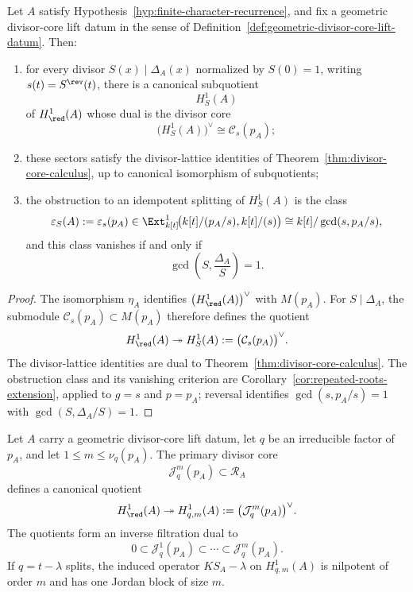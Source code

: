 \begin{theorem}
\label{thm:geometric-lift-datum-consequences}
Let \(A\) satisfy Hypothesis~\ref{hyp:finite-character-recurrence}, and fix a
geometric divisor-core lift datum in the sense of
Definition~\ref{def:geometric-divisor-core-lift-datum}.
Then:
\begin{enumerate}[label=\textup{(\roman*)}]
\item for every divisor \(S(x)\mid \Delta_A(x)\) normalized by \(S(0)=1\), writing \(s(t)=S^{\rev}(t)\), there is a canonical subquotient
\[
H^1_S(A)
\]
of \(H^1_{\red}(A)\) whose dual is the divisor core
\[
\bigl(H^1_S(A)\bigr)^\vee \cong \mathcal C_s(p_A);
\]

\item these sectors satisfy the divisor-lattice identities of Theorem~\ref{thm:divisor-core-calculus}, up to canonical isomorphism of subquotients;

\item the obstruction to an idempotent splitting of \(H^1_S(A)\) is the class
\[
\varepsilon_S(A):=\varepsilon_s(p_A)\in
\Ext^1_{k[t]}\!\bigl(k[t]/(p_A/s),k[t]/(s)\bigr)
\cong k[t]/\gcd(s,p_A/s),
\]
and this class vanishes if and only if
\[
\gcd\!\left(S,\frac{\Delta_A}{S}\right)=1.
\]
\end{enumerate}
\end{theorem}

\begin{proof}
The isomorphism \(\eta_A\) identifies \(\bigl(H^1_{\red}(A)\bigr)^\vee\)
with \(M(p_A)\).
For \(S\mid \Delta_A\), the submodule \(\mathcal C_s(p_A)\subset M(p_A)\)
therefore defines the quotient
\[
H^1_{\red}(A)\twoheadrightarrow H^1_S(A):=\bigl(\mathcal C_s(p_A)\bigr)^\vee.
\]
The divisor-lattice identities are dual to Theorem~\ref{thm:divisor-core-calculus}.
The obstruction class and its vanishing criterion are
Corollary~\ref{cor:repeated-roots-extension}, applied to \(g=s\) and
\(p=p_A\); reversal identifies \(\gcd(s,p_A/s)=1\) with
\(\gcd(S,\Delta_A/S)=1\).
\end{proof}

\begin{proposition}
\label{prop:primary-quotient-filtration-lift}
Let \(A\) carry a geometric divisor-core lift datum, let \(q\) be an
irreducible factor of \(p_A\), and let \(1\le m\le \nu_q(p_A)\).
The primary divisor core
\[
\mathcal J_q^m(p_A)\subset \mathcal R_A
\]
defines a canonical quotient
\[
H^1_{\red}(A)\twoheadrightarrow
H^1_{q,m}(A):=\bigl(\mathcal J_q^m(p_A)\bigr)^\vee.
\]
The quotients form an inverse filtration dual to
\[
0\subset \mathcal J_q^1(p_A)\subset\cdots\subset \mathcal J_q^m(p_A).
\]
If \(q=t-\lambda\) splits, the induced operator \(KS_A-\lambda\) on
\(H^1_{q,m}(A)\) is nilpotent of order \(m\) and has one Jordan block of
size \(m\).
\end{proposition}

